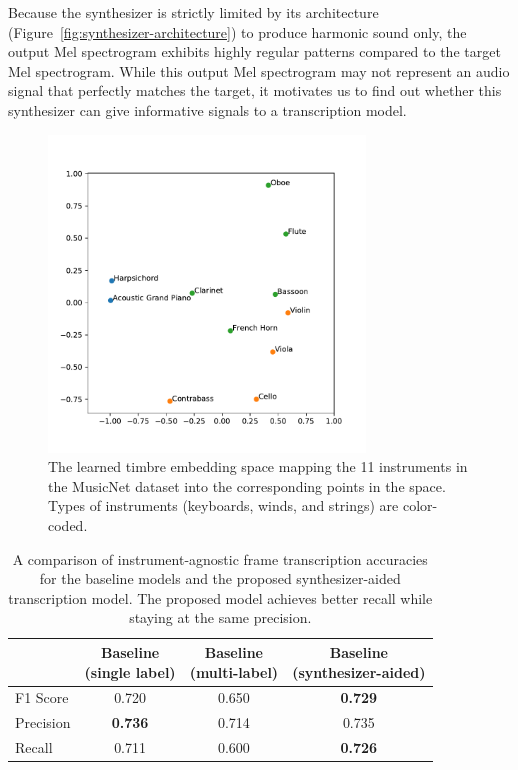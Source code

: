 Because the synthesizer is strictly limited by its architecture (Figure~\ref{fig:synthesizer-architecture}) to produce harmonic sound only, the output Mel spectrogram exhibits highly regular patterns compared to the target Mel spectrogram.
While this output Mel spectrogram may not represent an audio signal that perfectly matches the target, it motivates us to find out whether this synthesizer can give informative signals to a transcription model.

\begin{figure}
	\centering
	\includegraphics[width=0.75\textwidth]{cosine_distance.pdf}
	\vspace{-1em}
	\caption{The learned timbre embedding space mapping the 11 instruments in the MusicNet dataset into the corresponding points in the space. Types of instruments (keyboards, winds, and strings) are color-coded.}\label{fig:learned-timbre-embedding}
\end{figure}

\begin{table}
	\centering\small
	\begin{tabular}{l|ccc}
		& \makecell{Baseline \\ (single label)} & \makecell{Baseline \\ (multi-label)} & \makecell{Baseline \\ (synthesizer-aided)} \\ \hline
		F1 Score & 0.720 & 0.650 & \textbf{0.729} \\
		Precision & \textbf{0.736} & 0.714 & 0.735 \\
		Recall & 0.711 & 0.600 & \textbf{0.726} \\
	\end{tabular}
	\vspace{1em}
	\caption{A comparison of instrument-agnostic frame transcription accuracies for the baseline models and the proposed synthesizer-aided transcription model. The proposed model achieves better recall while staying at the same precision.}\label{tab:transcription-accuracy-comparison}
\end{table}

